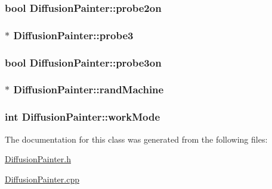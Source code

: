 \hypertarget{class_diffusion_painter_a7a436a62915aff0201b9b5e742ca9a62}{
\subsubsection[{probe2on}]{\setlength{\rightskip}{0pt plus 5cm}bool Diffusion\+Painter\+::probe2on}}\label{class_diffusion_painter_a7a436a62915aff0201b9b5e742ca9a62}
\hypertarget{class_diffusion_painter_a977dd52f37fe18bac0c3c3f33e5aafa4}{
\subsubsection[{probe3}]{$\ast$ Diffusion\+Painter\+::probe3}}\label{class_diffusion_painter_a977dd52f37fe18bac0c3c3f33e5aafa4}
\hypertarget{class_diffusion_painter_ad923bf9dfbf4a10b8231037cf3070831}{
\subsubsection[{probe3on}]{\setlength{\rightskip}{0pt plus 5cm}bool Diffusion\+Painter\+::probe3on}}\label{class_diffusion_painter_ad923bf9dfbf4a10b8231037cf3070831}
\hypertarget{class_diffusion_painter_a899e223882748c213c482f298ed2cc6a}{
\subsubsection[{rand\+Machine}]{$\ast$ Diffusion\+Painter\+::rand\+Machine}}\label{class_diffusion_painter_a899e223882748c213c482f298ed2cc6a}
\hypertarget{class_diffusion_painter_a30867ab87333582db17ae21e586adc36}{
\subsubsection[{work\+Mode}]{\setlength{\rightskip}{0pt plus 5cm}int Diffusion\+Painter\+::work\+Mode}}\label{class_diffusion_painter_a30867ab87333582db17ae21e586adc36}


The documentation for this class was generated from the following files\+:\begin{DoxyCompactItemize}
\item 
\hyperlink{_diffusion_painter_8h}{Diffusion\+Painter.\+h}\item 
\hyperlink{_diffusion_painter_8cpp}{Diffusion\+Painter.\+cpp}\end{DoxyCompactItemize}
